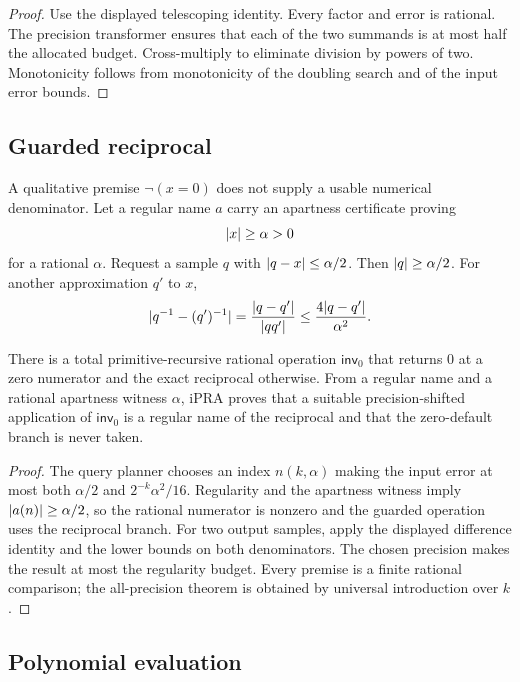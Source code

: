 \begin{proof}
Use the displayed telescoping identity.  Every factor and error is rational.  The precision transformer ensures that each of the two summands is at most half the allocated budget.  Cross-multiply to eliminate division by powers of two.  Monotonicity follows from monotonicity of the doubling search and of the input error bounds.
\end{proof}

\subsection{Guarded reciprocal}

A qualitative premise $\neg(x=0)$ does not supply a usable numerical denominator.  Let a regular name $a$ carry an apartness certificate proving
\[
  \lvert x\rvert\ge\alpha>0
\]
for a rational $\alpha$.  Request a sample $q$ with $\lvert q-x\rvert\le\alpha/2$.  Then $\lvert q\rvert\ge\alpha/2$.  For another approximation $q'$ to $x$,
\[
 \lvert q^{-1}-(q')^{-1}\rvert
 =\frac{\lvert q-q'\rvert}{\lvert q q'\rvert}
 \le \frac{4\lvert q-q'\rvert}{\alpha^2}.
\]

\begin{theorem}
\label{thm:guarded-inverse}
There is a total primitive-recursive rational operation $\mathsf{inv}_0$ that returns $0$ at a zero numerator and the exact reciprocal otherwise.  From a regular name and a rational apartness witness $\alpha$, iPRA proves that a suitable precision-shifted application of $\mathsf{inv}_0$ is a regular name of the reciprocal and that the zero-default branch is never taken.
\end{theorem}

\begin{proof}
The query planner chooses an index $n(k,\alpha)$ making the input error at most both $\alpha/2$ and $2^{-k}\alpha^2/16$.  Regularity and the apartness witness imply $\lvert a(n)\rvert\ge\alpha/2$, so the rational numerator is nonzero and the guarded operation uses the reciprocal branch.  For two output samples, apply the displayed difference identity and the lower bounds on both denominators.  The chosen precision makes the result at most the regularity budget.  Every premise is a finite rational comparison; the all-precision theorem is obtained by universal introduction over $k$.
\end{proof}

\subsection{Polynomial evaluation}

